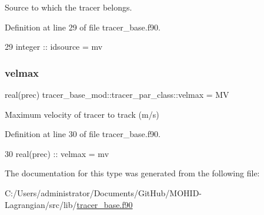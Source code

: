 Source to which the tracer belongs. 



Definition at line 29 of file tracer\+\_\+base.\+f90.


\begin{DoxyCode}
29         \textcolor{keywordtype}{integer} :: idsource = mv                 
\end{DoxyCode}
\mbox{\label{structtracer__base__mod_1_1tracer__par__class_a58ad740d66f1c65d200ad7bd22fbcb77}} 
\subsubsection{\texorpdfstring{velmax}{velmax}}
{\footnotesize\ttfamily real(prec) tracer\+\_\+base\+\_\+mod\+::tracer\+\_\+par\+\_\+class\+::velmax = MV\hspace{0.3cm}{\ttfamily [private]}}



Maximum velocity of tracer to track (m/s) 



Definition at line 30 of file tracer\+\_\+base.\+f90.


\begin{DoxyCode}
30         \textcolor{keywordtype}{real(prec)} :: velmax = mv                
\end{DoxyCode}


The documentation for this type was generated from the following file\+:\begin{DoxyCompactItemize}
\item 
C\+:/\+Users/administrator/\+Documents/\+Git\+Hub/\+M\+O\+H\+I\+D-\/\+Lagrangian/src/lib/\mbox{\hyperlink{tracer__base_8f90}{tracer\+\_\+base.\+f90}}\end{DoxyCompactItemize}
